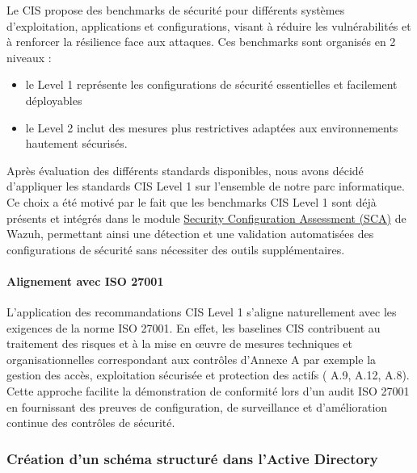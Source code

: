 \documentclass[a4paper, 11pt]{article}
\begin{document}
  Le CIS propose des benchmarks de sécurité pour différents systèmes d'exploitation, applications et configurations,
   visant à réduire les vulnérabilités et à renforcer la résilience face aux attaques. Ces benchmarks sont organisés en 2 niveaux :
   \par\bigskip
  \begin{itemize}
    \item[$\bullet$] le Level 1 représente les configurations de sécurité essentielles et facilement déployables
    \item[$\bullet$] le Level 2 inclut des mesures plus restrictives adaptées aux environnements hautement sécurisés.
  \end{itemize}

  
  \par\bigskip
  
  Après évaluation des différents standards disponibles, nous avons décidé d'appliquer les standards CIS Level 1 sur l'ensemble de notre parc informatique.
  Ce choix a été motivé par le fait que les benchmarks CIS Level 1 sont déjà présents et intégrés dans le module \href{https://wazuh.com/resources/what-is/configuration-assessment/#:~:text=Configuration%20assessment%20involves%20analyzing%2C%20auditing,best%20practices%2C%20and%20regulatory%20requirements.}{Security Configuration Assessment (SCA)} de Wazuh,
  permettant ainsi une détection et une validation automatisées des configurations de sécurité sans nécessiter des outils supplémentaires.

  \par\bigskip
  \paragraph{Alignement avec ISO 27001}

L'application des recommandations CIS Level 1 s'aligne naturellement avec
 les exigences de la norme ISO 27001. En effet, les baselines CIS contribuent au traitement des risques 
 et à la mise en œuvre de mesures techniques et organisationnelles correspondant aux contrôles 
 d'Annexe A par exemple la gestion des accès, exploitation sécurisée et protection des actifs ( A.9, A.12, A.8). 
 Cette approche facilite la démonstration de conformité lors d'un audit ISO 27001 en fournissant des preuves de
  configuration, de surveillance et d'amélioration continue des contrôles de sécurité.

 \newpage 
\subsubsection{Création d'un schéma structuré dans l'Active Directory}
\end{document}
